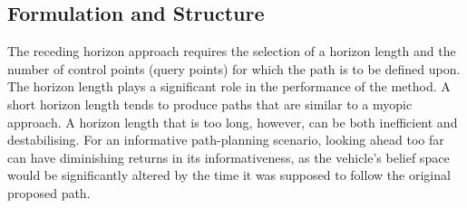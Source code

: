 	

		
		\subsection{Formulation and Structure}
	
			The receding horizon approach requires the selection of a horizon length and the number of control points (query points) for which the path is to be defined upon. The horizon length plays a significant role in the performance of the method. A short horizon length tends to produce paths that are similar to a myopic approach. A horizon length that is too long, however, can be both inefficient and destabilising. For an informative path-planning scenario, looking ahead too far can have diminishing returns in its informativeness, as the vehicle's belief space would be significantly altered by the time it was supposed to follow the original proposed path.
	
